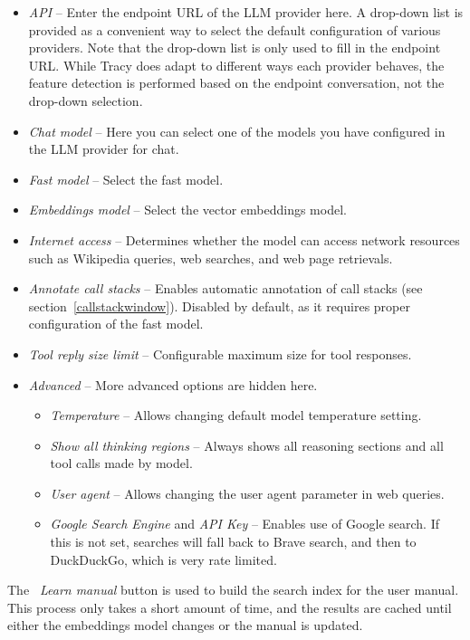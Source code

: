 \documentclass[hidelinks,titlepage,a4paper,twoside]{article}
\begin{document}
\begin{itemize}
\item \emph{API} -- Enter the endpoint URL of the LLM provider here. A drop-down list is provided as a convenient way to select the default configuration of various providers. Note that the drop-down list is only used to fill in the endpoint URL. While Tracy does adapt to different ways each provider behaves, the feature detection is performed based on the endpoint conversation, not the drop-down selection.
\item \emph{Chat model} -- Here you can select one of the models you have configured in the LLM provider for chat.
\item \emph{Fast model} -- Select the fast model.
\item \emph{Embeddings model} -- Select the vector embeddings model.
\item \emph{Internet access} -- Determines whether the model can access network resources such as Wikipedia queries, web searches, and web page retrievals.
\item \emph{Annotate call stacks} -- Enables automatic annotation of call stacks (see section~\ref{callstackwindow}). Disabled by default, as it requires proper configuration of the fast model.
\item \emph{Tool reply size limit} -- Configurable maximum size for tool responses.
\item \emph{Advanced} -- More advanced options are hidden here.
\begin{itemize}
\item \emph{Temperature} -- Allows changing default model temperature setting.
\item \emph{Show all thinking regions} -- Always shows all reasoning sections and all tool calls made by model.
\item \emph{User agent} -- Allows changing the user agent parameter in web queries.
\item \emph{Google Search Engine} and \emph{API Key} -- Enables use of Google search. If this is not set, searches will fall back to Brave search, and then to DuckDuckGo, which is very rate limited.
\end{itemize}
\end{itemize}

The \emph{\faBook{}~Learn manual} button is used to build the search index for the user manual. This process only takes a short amount of time, and the results are cached until either the embeddings model changes or the manual is updated.
\end{document}
